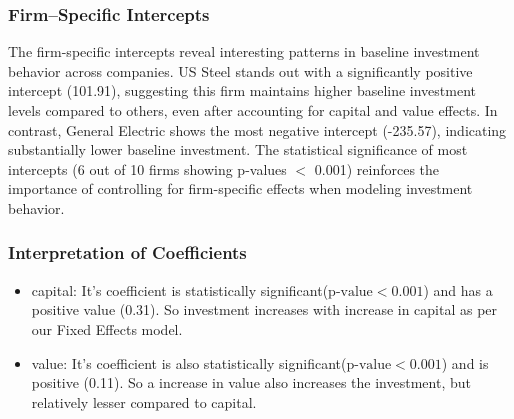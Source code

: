 \documentclass[a4paper]{article}
\begin{document}


\subsubsection*{\textbf{Firm--Specific Intercepts}}
The firm-specific intercepts reveal interesting patterns in baseline investment behavior across companies. US Steel stands out with a significantly positive intercept (101.91), suggesting this firm maintains higher baseline investment levels compared to others, even after accounting for capital and value effects. In contrast, General Electric shows the most negative intercept (-235.57), indicating substantially lower baseline investment. The statistical significance of most intercepts (6 out of 10 firms showing p-values \(<\) 0.001) reinforces the importance of controlling for firm-specific effects when modeling investment behavior.

\subsubsection*{\textbf{Interpretation of Coefficients}}
\begin{itemize}
    \item capital:  It's coefficient is statistically significant(\(\text{p-value}<0.001\)) and has a positive value (0.31). So investment increases with increase in capital as per our Fixed Effects model.
    
    \item value: It's coefficient is also statistically significant(\(\text{p-value}<0.001\)) and is positive (0.11). So a increase in value also increases the investment, but relatively lesser compared to capital. 

\end{itemize}


\newpage
\end{document}
